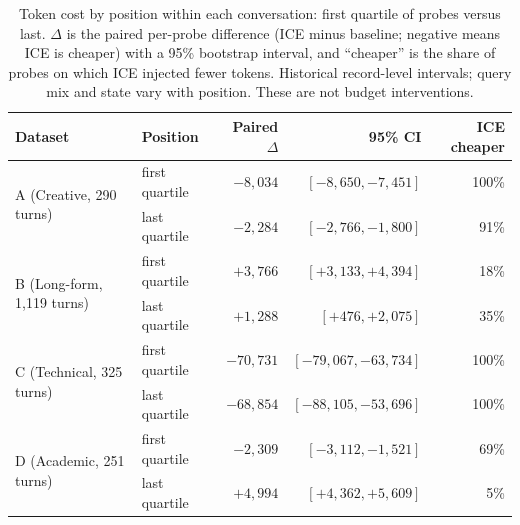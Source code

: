 \documentclass[twoside,11pt]{article}
\begin{document}
\begin{table}[tbp]
\centering
\small


\begin{tabular}{@{}llrrr@{}}
\toprule
\textbf{Dataset} & \textbf{Position} & \textbf{Paired $\Delta$} & \textbf{95\% CI} & \textbf{ICE cheaper} \\
\midrule
\multirow{2}{*}{A (Creative, 290 turns)} & first quartile & $-8{,}034$ & $[-8{,}650, -7{,}451]$ & 100\% \\
                                          & last quartile  & $-2{,}284$ & $[-2{,}766, -1{,}800]$ & 91\% \\
\midrule
\multirow{2}{*}{B (Long-form, 1{,}119 turns)} & first quartile & $+3{,}766$ & $[+3{,}133, +4{,}394]$ & 18\% \\
                                               & last quartile  & $+1{,}288$ & $[+476, +2{,}075]$ & 35\% \\
\midrule
\multirow{2}{*}{C (Technical, 325 turns)} & first quartile & $-70{,}731$ & $[-79{,}067, -63{,}734]$ & 100\% \\
                                           & last quartile  & $-68{,}854$ & $[-88{,}105, -53{,}696]$ & 100\% \\
\midrule
\multirow{2}{*}{D (Academic, 251 turns)} & first quartile & $-2{,}309$ & $[-3{,}112, -1{,}521]$ & 69\% \\
                                          & last quartile  & $+4{,}994$ & $[+4{,}362, +5{,}609]$ & 5\% \\
\bottomrule
\end{tabular}
\caption{Token cost by position within each conversation: first quartile of probes versus last. $\Delta$ is the paired per-probe difference (ICE minus baseline; negative means ICE is cheaper) with a 95\% bootstrap interval, and ``cheaper'' is the share of probes on which ICE injected fewer tokens. Historical record-level intervals; query mix and state vary with position. These are not budget interventions.}
\label{tab:token-crossover}
\end{table}
\end{document}
